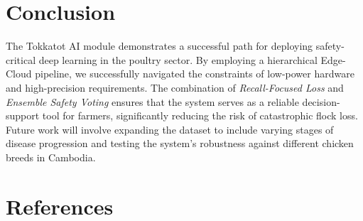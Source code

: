 \documentclass[12pt,a4paper]{article}
\begin{document}
\section{Conclusion}
The Tokkatot AI module demonstrates a successful path for deploying safety-critical deep learning in the poultry sector. By employing a hierarchical Edge-Cloud pipeline, we successfully navigated the constraints of low-power hardware and high-precision requirements. The combination of \textit{Recall-Focused Loss} and \textit{Ensemble Safety Voting} ensures that the system serves as a reliable decision-support tool for farmers, significantly reducing the risk of catastrophic flock loss. Future work will involve expanding the dataset to include varying stages of disease progression and testing the system's robustness against different chicken breeds in Cambodia.

\section{References}

\end{document}
